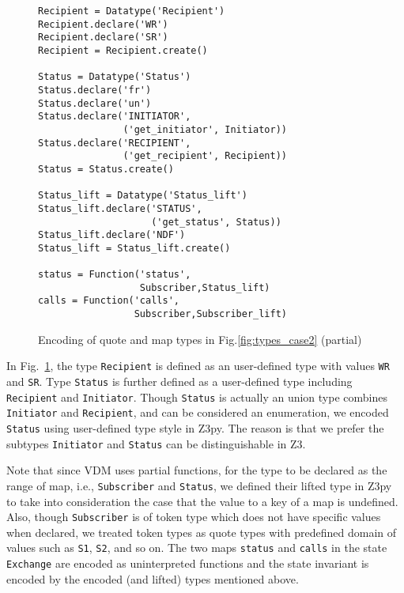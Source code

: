\begin{figure}[t]
\begin{center}
\begin{mdframed}[roundcorner=5pt,shadow=true]
\begin{Verbatim}[fontsize=\small]
Recipient = Datatype('Recipient')
Recipient.declare('WR')
Recipient.declare('SR')
Recipient = Recipient.create()

Status = Datatype('Status')
Status.declare('fr')
Status.declare('un')
Status.declare('INITIATOR',
               ('get_initiator', Initiator))
Status.declare('RECIPIENT',
               ('get_recipient', Recipient))
Status = Status.create()

Status_lift = Datatype('Status_lift')
Status_lift.declare('STATUS',
                    ('get_status', Status))
Status_lift.declare('NDF')
Status_lift = Status_lift.create()

status = Function('status',
                  Subscriber,Status_lift)
calls = Function('calls',
                 Subscriber,Subscriber_lift)
\end{Verbatim}
\end{mdframed}
\vspace{-10pt}
\caption{Encoding of quote and map types in Fig.\ref{fig:types_case2} (partial)}
\label{fig:encode_types_case2}
\end{center}
\end{figure}

In Fig.~\ref{fig:encode_types_case2}, the type {\tt Recipient} is defined as an user-defined type with values {\tt WR} and {\tt SR}. Type {\tt Status} is further defined as a user-defined type including {\tt Recipient} and {\tt Initiator}. Though {\tt Status} is actually an union type combines {\tt Initiator} and {\tt Recipient}, and can be considered an enumeration, we encoded {\tt Status} using user-defined type style in Z3py. The reason is that we prefer the subtypes {\tt Initiator} and {\tt Status} can be distinguishable in Z3.

Note that since VDM uses partial functions, for the type to be declared as the range of map, i.e., {\tt Subscriber} and {\tt Status}, we defined their lifted type in Z3py to take into consideration the case that the value to a key of a map is undefined. Also, though {\tt Subscriber} is of token type which does not have specific values when declared, we treated token types as quote types with predefined domain of values such as {\tt S1}, {\tt S2}, and so on. The two maps {\tt status} and {\tt calls} in the state {\tt Exchange} are encoded as uninterpreted functions and the state invariant is encoded by the encoded (and lifted) types mentioned above. 

